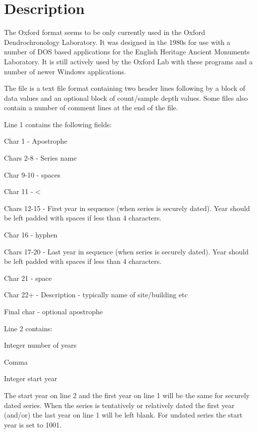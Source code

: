 \section{Description}

The Oxford format seems to be only currently used in the Oxford Dendrochronology Laboratory. It was designed in the 1980s for use with a number of DOS based applications for the English Heritage Ancient Monuments Laboratory. It is still actively used by the Oxford Lab with these programs and a number of newer Windows applications.

The file is a text file format containing two header lines following by a block of data values and an optional block of count/sample depth values. Some files also contain a number of comment lines at the end of the file.

Line 1 contains the following fields: 

\begin{itemize*}
 \item Char 1 - Apostrophe
 \item Chars 2-8 - Series name
 \item Char 9-10 - spaces
 \item Char 11 - <
 \item Chars 12-15 - First year in sequence (when series is securely dated).  Year should be left padded with spaces if less than 4 characters.
 \item Char 16 - hyphen
 \item Chars 17-20 - Last year in sequence (when series is securely dated).  Year should be left padded with spaces if less than 4 characters.
 \item Char 21 - space
 \item Char 22+ - Description - typically name of site/building etc
 \item Final char - optional apostrophe 
\end{itemize*}

Line 2 contains:

\begin{itemize*}
 \item Integer number of years
 \item Comma
 \item Integer start year
\end{itemize*}


The start year on line 2 and the first year on line 1 will be the same for securely dated series. When the series is tentatively or relatively dated the first year (and/or) the last year on line 1 will be left blank. For undated series the start year is set to 1001.

